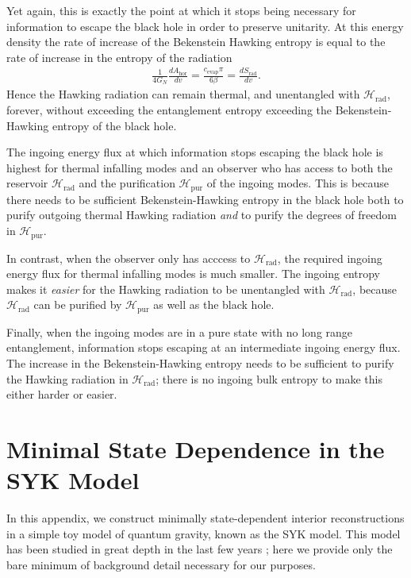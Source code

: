 \documentclass[12pt]{article}
\newcommand{\Srad}{S_\text{rad} }
\begin{document}
Yet again, this is exactly the point at which it stops being necessary for information to escape the black hole in order to preserve unitarity. At this energy density the rate of increase of the Bekenstein Hawking entropy is equal to the rate of increase in the entropy of the radiation
\begin{align} \label{eq:T'entropyincrease}
\frac{1}{4 G_N} \frac{d A_\text{hor}}{d v} = \frac{c_\text{evap} \pi}{6 \beta} = \frac{d \Srad}{d v}.
\end{align}
Hence the Hawking radiation can remain thermal, and unentangled with $\mathcal{H}_\text{rad}$, forever, without exceeding the entanglement entropy exceeding the Bekenstein-Hawking entropy of the black hole. 

The ingoing energy flux at which information stops escaping the black hole is highest for thermal infalling modes and an observer who has access to both the reservoir $\mathcal{H}_\text{rad}$ and the purification $\mathcal{H}_\text{pur}$ of the ingoing modes. This is because there needs to be sufficient Bekenstein-Hawking entropy in the black hole both to purify outgoing thermal Hawking radiation \emph{and} to purify the degrees of freedom in $\mathcal{H}_\text{pur}$.

In contrast, when the observer only has acccess to $\mathcal{H}_\text{rad}$, the required ingoing energy flux for thermal infalling modes is much smaller. The ingoing entropy makes it \emph{easier} for the Hawking radiation to be unentangled with $\mathcal{H}_\text{rad}$, because $\mathcal{H}_\text{rad}$ can be purified by $\mathcal{H}_\text{pur}$ as well as the black hole.

Finally, when the ingoing modes are in a pure state with no long range entanglement, information stops escaping at an intermediate ingoing energy flux. The increase in the Bekenstein-Hawking entropy needs to be sufficient to purify the Hawking radiation in $\mathcal{H}_\text{rad}$; there is no ingoing bulk entropy to make this either harder or easier.

\section{Minimal State Dependence in the SYK Model} \label{app:syk}
In this appendix, we construct minimally state-dependent interior reconstructions in a simple toy model of quantum gravity, known as the SYK model. This model has been studied in great depth in the last few years \cite{sachdev1993gapless, kitaev2015simple, maldacena2016remarks, polchinski2016spectrum, cotler2017black, saad2018semiclassical}; here we provide only the bare minimum of background detail necessary for our purposes. 
\end{document}
